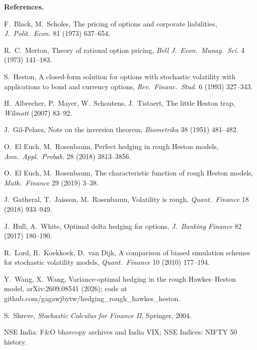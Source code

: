 \documentclass[10pt,leqno]{amsart}
\newcommand{\heading}[1]{\medskip\noindent\textbf{#1}\par}
\begin{document}
\heading{References.}
\begin{compactenum}[\small 1.]
\item {\small F.\ Black, M.\ Scholes, The pricing of options and corporate liabilities, \emph{J.\ Polit.\ Econ.} 81 (1973) 637--654.}
\item {\small R.\ C.\ Merton, Theory of rational option pricing, \emph{Bell J.\ Econ.\ Manag.\ Sci.} 4 (1973) 141--183.}
\item {\small S.\ Heston, A closed-form solution for options with stochastic volatility with applications to bond and currency options, \emph{Rev.\ Financ.\ Stud.} 6 (1993) 327--343.}
\item {\small H.\ Albrecher, P.\ Mayer, W.\ Schoutens, J.\ Tistaert, The little Heston trap, \emph{Wilmott} (2007) 83--92.}
\item {\small J.\ Gil-Pelaez, Note on the inversion theorem, \emph{Biometrika} 38 (1951) 481--482.}
\item {\small O.\ El Euch, M.\ Rosenbaum, Perfect hedging in rough Heston models, \emph{Ann.\ Appl.\ Probab.} 28 (2018) 3813--3856.}
\item {\small O.\ El Euch, M.\ Rosenbaum, The characteristic function of rough Heston models, \emph{Math.\ Finance} 29 (2019) 3--38.}
\item {\small J.\ Gatheral, T.\ Jaisson, M.\ Rosenbaum, Volatility is rough, \emph{Quant.\ Finance} 18 (2018) 933--949.}
\item {\small J.\ Hull, A.\ White, Optimal delta hedging for options, \emph{J.\ Banking Finance} 82 (2017) 180--190.}
\item {\small R.\ Lord, R.\ Koekkoek, D.\ van Dijk, A comparison of biased simulation schemes for stochastic volatility models, \emph{Quant.\ Finance} 10 (2010) 177--194.}
\item {\small Y.\ Wang, X.\ Wang, Variance-optimal hedging in the rough Hawkes--Heston model, arXiv:2609.08541 (2026); code at github.com/gagawjbytw/hedging\_rough\_hawkes\_heston.}
\item {\small S.\ Shreve, \emph{Stochastic Calculus for Finance II}, Springer, 2004.}
\item {\small NSE India: F\&O bhavcopy archives and India VIX; NSE Indices: NIFTY 50 history.}
\end{compactenum}

\bigskip
\noindent\begin{minipage}{\textwidth}   %
\ifdefined\PublicBuild

\else
{}
\fi
\end{minipage}
\end{document}

